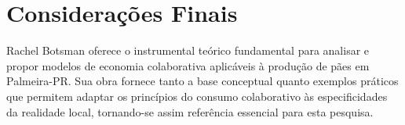\documentclass[12pt, a4paper]{article}
\begin{document}
\section{Considerações Finais}

Rachel Botsman oferece o instrumental teórico fundamental para analisar e propor modelos de economia colaborativa aplicáveis à produção de pães em Palmeira-PR. Sua obra fornece tanto a base conceptual quanto exemplos práticos que permitem adaptar os princípios do consumo colaborativo às especificidades da realidade local, tornando-se assim referência essencial para esta pesquisa.
\end{document}

